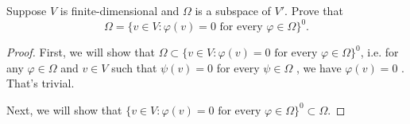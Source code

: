 \documentclass{article}
\begin{document}
\begin{problem}[3F-26]
	Suppose $V$ is finite-dimensional and $\Omega$ is a subspace of $V'$. Prove
	that
	\[
		\Omega = \{v \in V : \varphi(v) = 0 \text{ for every } \varphi \in \Omega\}^0.
	\]
\end{problem}

\begin{proof}
	First, we will show that \( \Omega\subset \{v\in V:\varphi(v)=0\text{ for every }\varphi\in\Omega\}^0 \), i.e. for any \( \varphi\in \Omega \) and \( v\in V \) such that \( \psi(v)=0 \) for every \( \psi\in\Omega \) , we have \( \varphi(v)=0 \) . That's trivial.\par
	Next, we will show that \( \{v\in V:\varphi(v)=0\text{ for every }\varphi\in\Omega\}^0\subset \Omega \). 
\end{proof}
\end{document}
